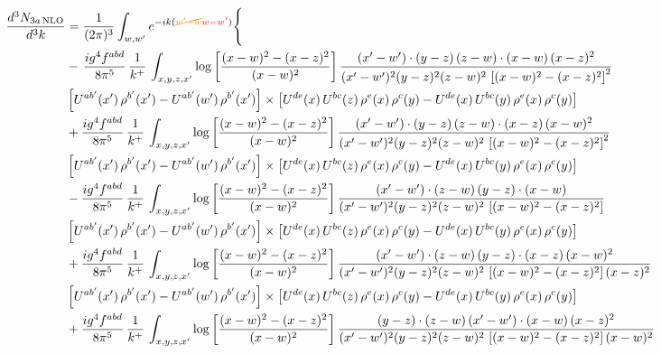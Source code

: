 \documentclass[9pt]{article}
\numberwithin{equation}{section}
\begin{document}
\begin{align}
\frac{d^{3}N_{3a\,\rm NLO}}{d^{3}k} & = \frac{1}{(2\pi)^{3}}\int_{w,w'}e^{-ik({\color{orange}\cancel{w'-w}}{\color{red}w-w'})}\Bigg\{\notag \\
& -\,\frac{ig^{4}f^{abd}}{8\pi^{5}}\,\frac{1}{k^{+}}\,\int_{x,y,z,x'}\log{\left[\frac{(x-w)^{2}-(x-z)^{2}}{(x-w)^{2}}\right]}\,
\frac{(x'-w')\cdot(y-z)\,(z-w)\cdot(x-w)\,(x-z)^{2}}{(x'-w')^{2}(y-z)^{2}(z-w)^{2}\,\left[(x-w)^{2}-(x-z)^{2}\right]^{2}}\notag \\ & \left[U^{ab'}(x')\,\rho^{b'}(x')-U^{ab'}(w')\, \rho^{b'}(x')\right]\times \left[U^{de}(x)\,U^{bc}(z)\, \rho^{e}(x)\,\rho^{c}(y)-U^{de}(x)\,U^{bc}(y)\,\rho^{e}(x)\,\rho^{c}(y)\right] \notag \\
& +\frac{ig^{4}f^{abd}}{8\pi^{5}}\,\frac{1}{k^{+}}\,\int_{x,y,z,x'}\log{\left[\frac{(x-w)^{2}-(x-z)^{2}}{(x-w)^{2}}\right]}\,
\frac{(x'-w')\cdot(y-z)\,(z-w)\cdot(x-z)\,(x-w)^{2}}{(x'-w')^{2}(y-z)^{2}(z-w)^{2}\,\left[(x-w)^{2}-(x-z)^{2}\right]^{2}}\notag \\ 
&\left[U^{ab'}(x')\,\rho^{b'}(x')-U^{ab'}(w')\, \rho^{b'}(x')\right]\times \left[U^{de}(x)\,U^{bc}(z)\, \rho^{e}(x)\,\rho^{c}(y)-U^{de}(x)\,U^{bc}(y)\,\rho^{e}(x)\,\rho^{c}(y)\right] \notag \\
& -\frac{ig^{4}f^{abd}}{8\pi^{5}}\,\frac{1}{k^{+}}\,\int_{x,y,z,x'}\log{\left[\frac{(x-w)^{2}-(x-z)^{2}}{(x-w)^{2}}\right]}\,
\frac{(x'-w')\cdot(z-w)\,(y-z)\cdot(x-w)}{(x'-w')^{2}(y-z)^{2}(z-w)^{2}\,\left[(x-w)^{2}-(x-z)^{2}\right]}\notag \\ & \left[U^{ab'}(x')\,\rho^{b'}(x')-U^{ab'}(w')\, \rho^{b'}(x')\right]\times \left[U^{de}(x)\,U^{bc}(z)\, \rho^{e}(x)\,\rho^{c}(y)-U^{de}(x)\,U^{bc}(y)\,\rho^{e}(x)\,\rho^{c}(y)\right] \notag \\
&  +\frac{ig^{4}f^{abd}}{8\pi^{5}}\,\frac{1}{k^{+}}\,\int_{x,y,z,x'}\log{\left[\frac{(x-w)^{2}-(x-z)^{2}}{(x-w)^{2}}\right]}\,
\frac{(x'-w')\cdot(z-w)\,(y-z)\cdot(x-z)\,(x-w)^{2}}{(x'-w')^{2}(y-z)^{2}(z-w)^{2}\,\left[(x-w)^{2}-(x-z)^{2}\right](x-z)^{2}}\notag \\ & \left[U^{ab'}(x')\,\rho^{b'}(x')-U^{ab'}(w')\, \rho^{b'}(x')\right]\times \left[U^{de}(x)\,U^{bc}(z)\, \rho^{e}(x)\,\rho^{c}(y)-U^{de}(x)\,U^{bc}(y)\,\rho^{e}(x)\,\rho^{c}(y)\right] \notag \\
& +\frac{ig^{4}f^{abd}}{8\pi^{5}}\,\frac{1}{k^{+}}\,\int_{x,y,z,x'}\log{\left[\frac{(x-w)^{2}-(x-z)^{2}}{(x-w)^{2}}\right]}\,
\frac{(y-z)\cdot(z-w)\,(x'-w')\cdot(x-w)\,(x-z)^{2}}{(x'-w')^{2}(y-z)^{2}(z-w)^{2}\,\left[(x-w)^{2}-(x-z)^{2}\right](x-w)^{2}}\notag \\ 

\end{align}
\end{document}
